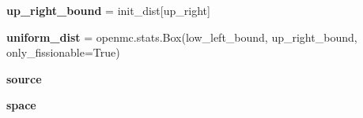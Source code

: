 \begin{DoxyCompactItemize}
\item 
\mbox{\label{classonix_1_1couple_1_1couple__openmc_1_1Couple__openmc_a75de8289a47127eef62b8f2be6c24287}} 
{\bfseries up\+\_\+right\+\_\+bound} = init\+\_\+dist\mbox{[}\textquotesingle{}up\+\_\+right\textquotesingle{}\mbox{]}
\item 
\mbox{\label{classonix_1_1couple_1_1couple__openmc_1_1Couple__openmc_a52df5cdea9adf03dd3a9ba2b21e5cd3a}} 
{\bfseries uniform\+\_\+dist} = openmc.\+stats.\+Box(low\+\_\+left\+\_\+bound, up\+\_\+right\+\_\+bound, only\+\_\+fissionable=True)
\item 
\mbox{\label{classonix_1_1couple_1_1couple__openmc_1_1Couple__openmc_a60550411b7e6a09d07f9608f303e08f7}} 
{\bfseries source}
\item 
\mbox{\label{classonix_1_1couple_1_1couple__openmc_1_1Couple__openmc_a8ca4a5156df1fecfca8d79e0d0aa372c}} 
{\bfseries space}
\end{DoxyCompactItemize}


